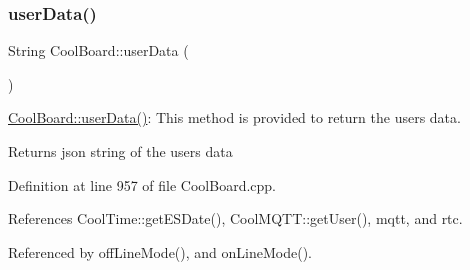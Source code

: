 \subsubsection{\texorpdfstring{user\+Data()}{userData()}}
{\footnotesize\ttfamily String Cool\+Board\+::user\+Data (\begin{DoxyParamCaption}{ }\end{DoxyParamCaption})}

\hyperlink{classCoolBoard_ae7358fb6e623cfc81b775f5f1734909b}{Cool\+Board\+::user\+Data()}\+: This method is provided to return the user\textquotesingle{}s data.

\begin{DoxyReturn}{Returns}
json string of the user\textquotesingle{}s data 
\end{DoxyReturn}


Definition at line 957 of file Cool\+Board.\+cpp.



References Cool\+Time\+::get\+E\+S\+Date(), Cool\+M\+Q\+T\+T\+::get\+User(), mqtt, and rtc.



Referenced by off\+Line\+Mode(), and on\+Line\+Mode().


